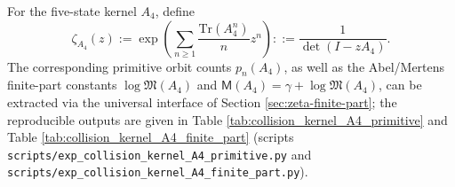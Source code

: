 



\begin{definition}\label{def:pom-collision-zeta-a4}
For the five-state kernel \(A_4\), define
$$
\zeta_{A_4}(z):=\exp\!\left(\sum_{n\ge 1}\frac{\mathrm{Tr}(A_4^n)}{n}z^n\right)
::=\frac{1}{\det(I-zA_4)}.
$$
The corresponding primitive orbit counts \(p_n(A_4)\), as well as the Abel/Mertens finite-part constants \(\log\mathfrak{M}(A_4)\) and \(\mathsf{M}(A_4)=\gamma+\log\mathfrak{M}(A_4)\), can be extracted via the universal interface of Section \ref{sec:zeta-finite-part}; the reproducible outputs are given in Table \ref{tab:collision_kernel_A4_primitive} and Table \ref{tab:collision_kernel_A4_finite_part} (scripts \texttt{scripts/exp\_collision\_kernel\_A4\_primitive.py} and \texttt{scripts/exp\_collision\_kernel\_A4\_finite\_part.py}).
\end{definition}




